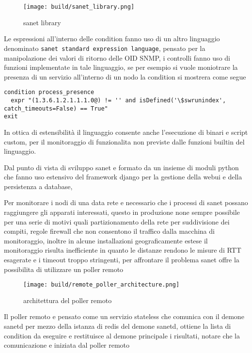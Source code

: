 \documentclass[12pt,a4paper,twoside,openright]{book}
\begin{document}
\begin{figure}[H]
    \centering
    \texttt{[image: build/sanet\_library.png]}
    \caption{sanet library}
    \label{fig:enter-label}
\end{figure}

Le espressioni all'interno delle condition fanno uso di un altro linguaggio denominato \verb|sanet standard expression language|, pensato per la manipolazione dei valori di ritorno delle OID SNMP, i controlli fanno uso di funzioni implementate in tale linguaggio, se per esempio si vuole moniotrare la presenza di un servizio all'interno di un nodo la condition si mostrera come segue

\begin{lstlisting}
condition process_presence
  expr "(1.3.6.1.2.1.1.1.0@) != '' and isDefined('\$swrunindex', catch_timeouts=False) == True"
exit
\end{lstlisting}

In ottica di estensibilità il linguaggio consente anche l'esecuzione di binari e script custom, per il monitoraggio di funzionalita non previste dalle funzioni builtin del linguaggio.

Dal punto di vista di sviluppo sanet e formato da un insieme di moduli python che fanno uso estensivo del framework django per la gestione della webui e della persistenza a database,

Per monitorare i nodi di una data rete e necessario che i processi di sanet possano raggiungere gli apparati interessati, questo in produzione none sempre possibile per una serie di motivi quali partizionamento della rete per suddivisione dei compiti, regole firewall che non consentono il traffico dalla macchina di monitoraggio, inoltre in alcune installazioni geograficamente estese il monitoraggio risulta inefficiente in quanto le distanze rendono le misure di RTT esagerate e i timeout troppo stringenti, per affrontare il problema sanet offre la possibilita di utilizzare un poller remoto

\begin{figure}[H]
    \centering
    \texttt{[image: build/remote\_poller\_architecture.png]}
    \caption{architettura del poller remoto}
    \label{fig:enter-label} \end{figure}

Il poller remoto e pensato come un servizio stateless che comunica con il demone sanetd per mezzo della istanza di redis del demone sanetd, ottiene la lista di condition da eseguire e restituisce al demone principale i risultati, notare che la comunicazione e iniziata dal poller remoto
\end{document}
